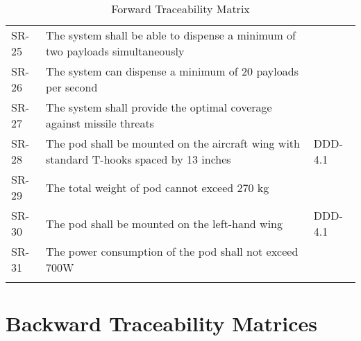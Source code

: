 \documentclass[Main]{subfiles}
\begin{document}
\begin{longtable}{p{} p{} p{}}
SR-25 & The system shall be able to dispense a minimum of two payloads simultaneously  &  \\

SR-26 & The system can dispense a minimum of 20 payloads per second &  \\

SR-27 & The system shall provide the optimal coverage against	missile threats &  \\

SR-28 & The pod shall be mounted on the aircraft wing with standard T-hooks spaced by 13 inches & DDD-4.1 \\

SR-29 & The total weight of pod cannot exceed 270 kg  &  \\

SR-30 & The pod shall be mounted on the left-hand wing & DDD-4.1 \\

SR-31 & The power consumption of the pod shall not exceed 700W &  \\\hline

\caption{Forward Traceability Matrix}
\label{Tab:Forward}
\end{longtable}





\newpage
\section{Backward Traceability Matrices}
\end{document}
